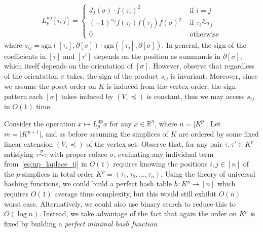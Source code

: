 \documentclass[10pt]{article}
\numberwithin{equation}{section}
\newcommand{\+}{%
	\raisebox{0.18ex}{\scaleobj{0.55}{+}}
}
\theoremstyle{definition}
\begin{document}
\begin{align}\label{eq:up_laplace_ij}
	 L_p^{\text{up}}[i,j] = \begin{cases}
		 d_f(\sigma) \cdot f(\tau_i)^2 & \text{ if } i = j \\ 
		(-1)^{s_{ij}} f(\tau_i)f(\tau_j)f(\sigma)^2 & \text{ if } \tau_i \overset{\sigma}{\sim} \tau_j \\
		0 & \text{ otherwise} 
	\end{cases}
\end{align}
where $s_{ij} = \mathrm{sgn}([\tau_i], \partial[\sigma]) \cdot \mathrm{sgn}([\tau_j], \partial[\sigma])$.
In general, the sign of the coefficients in $[\tau]$ and $[\tau']$ depends on the position as summands in $\partial[\sigma]$, which itself depends on the orientation of $[\sigma]$. However, observe that regardless of the orientation $\sigma$ takes, the sign of the product $s_{ij}$ is invariant. 
Moreover, since we assume the poset order on $K$ is induced from the vertex order, the sign pattern each $[\sigma]$ takes induced by $(V, \preceq)$ is constant, thus we may access $s_{ij}$ in $O(1)$ time.

Consider the operation $x \mapsto L_p^{\text{up}} x$ for any $x \in \mathbb{R}^n$, where $n = \lvert K^p \rvert$. Let $m = \lvert K^{p+1}\rvert$, and as before assuming the simplices of $K$ are ordered by some fixed linear extension $(V, \preceq)$ of the vertex set.
Observe that, for any pair $\tau, \tau' \in K^p$ satisfying $\tau \overset{\sigma}{\sim} \tau$ with proper coface $\sigma$, evaluating any individual term from~\eqref{eq:up_laplace_ij} in $O(1)$ requires knowing the positions $i,j \in [n]$ of the $p$-simplices in total order $K^p = (\tau_1, \tau_2, \dots, \tau_n)$. Using the theory of universal hashing functions, we could build a perfect hash table $h : K^p \to [n]$ which requires $O(1)$ average time complexity, but this would still exhibit $O(n)$ worst case. Alternatively, we could also use binary search to reduce this to $O(\log n)$. Instead, we take advantage of the fact that again the order on $K^p$ is fixed by building a \emph{perfect minimal hash function}. 
\end{document}
